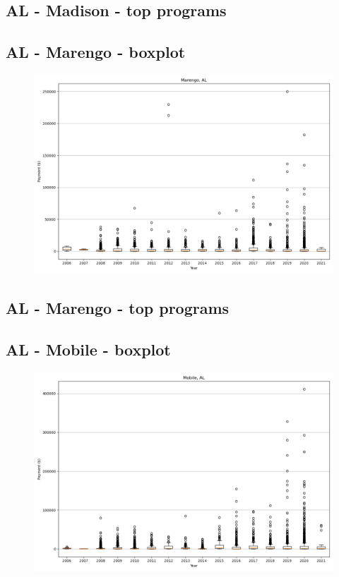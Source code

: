 \subsection*{AL - Madison - top programs}

\newpage
\subsection*{AL - Marengo - boxplot}
\begin{figure}[h]
\centering
\includegraphics[width=7in]{../output/boxplots/counties/Marengo-AL_boxplot.png}
\end{figure}


\subsection*{AL - Marengo - top programs}

\newpage
\subsection*{AL - Mobile - boxplot}
\begin{figure}[h]
\centering
\includegraphics[width=7in]{../output/boxplots/counties/Mobile-AL_boxplot.png}
\end{figure}


